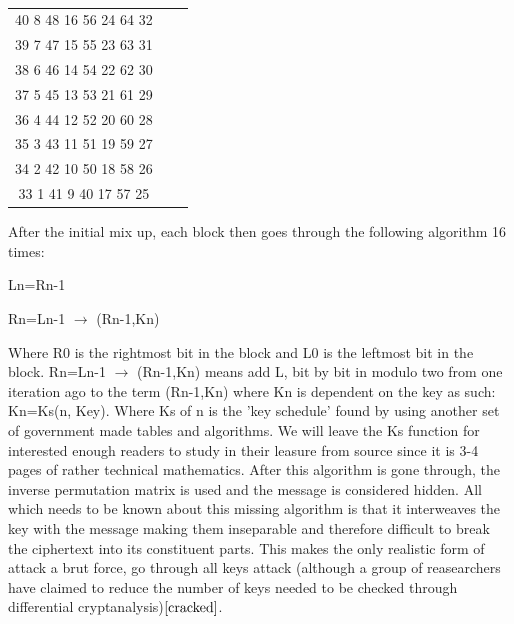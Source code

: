 \documentclass[12pt]{report}
\begin{document}
\begin{table}[h]

\begin{center}

\begin{tabular}{ccl}
40  8  48  16  56  24  64  32 &  \\
39  7  47  15  55  23  63  31 &  \\
38  6  46  14  54  22  62  30 &  \\
37  5  45  13  53  21  61  29 &  \\
36  4  44  12  52  20  60  28 &  \\
35  3  43  11  51  19  59  27 &  \\
34  2  42  10  50  18  58  26 &  \\
33  1  41  9   40  17  57  25 &  \\
\end{tabular}

\caption{}\cite{DESalgorithm} 

\end{center}

\end{table}
After the initial mix up, each block then goes through the following algorithm 16 times:
\begin{center}
Ln=Rn-1

Rn=Ln-1 $\rightarrow$ (Rn-1,Kn)
\end{center}

Where R0 is the rightmost bit in the block and L0 is the leftmost bit in the block.  Rn=Ln-1 $\rightarrow$ (Rn-1,Kn) means add L, bit by bit in modulo two from one iteration ago to the term (Rn-1,Kn) where Kn is dependent on the key as such:  Kn=Ks(n, Key).  Where Ks of n is the 'key schedule' found by using another set of government made tables and algorithms.  We will leave the Ks function for interested enough readers to study in their leasure from source \cite{DES} since it is 3-4 pages of rather technical mathematics.  After this algorithm is gone through, the inverse permutation matrix is used and the message is considered hidden.  All which needs to be known about this missing algorithm is that it interweaves the key with the message making them inseparable and therefore difficult to break the ciphertext into its constituent parts.  This makes the only realistic form of attack a brut force, go through all keys attack (although a group of reasearchers have claimed to reduce the number of keys needed to be checked through differential cryptanalysis)$\cite{cracked}$.  
\end{document}
